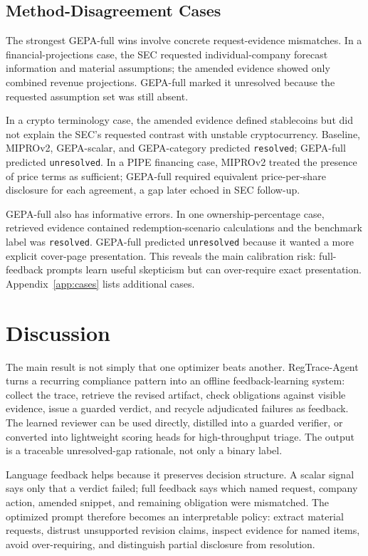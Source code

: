 \documentclass[11pt]{article}
\newcommand{\framework}{RegTrace-Agent}
\begin{document}
\subsection{Method-Disagreement Cases}

The strongest GEPA-full wins involve concrete request-evidence mismatches. In a financial-projections case, the SEC requested individual-company forecast information and material assumptions; the amended evidence showed only combined revenue projections. GEPA-full marked it unresolved because the requested assumption set was still absent.

In a crypto terminology case, the amended evidence defined stablecoins but did not explain the SEC's requested contrast with unstable cryptocurrency. Baseline, MIPROv2, GEPA-scalar, and GEPA-category predicted \texttt{resolved}; GEPA-full predicted \texttt{unresolved}. In a PIPE financing case, MIPROv2 treated the presence of price terms as sufficient; GEPA-full required equivalent price-per-share disclosure for each agreement, a gap later echoed in SEC follow-up.

GEPA-full also has informative errors. In one ownership-percentage case, retrieved evidence contained redemption-scenario calculations and the benchmark label was \texttt{resolved}. GEPA-full predicted \texttt{unresolved} because it wanted a more explicit cover-page presentation. This reveals the main calibration risk: full-feedback prompts learn useful skepticism but can over-require exact presentation. Appendix~\ref{app:cases} lists additional cases.

\section{Discussion}

The main result is not simply that one optimizer beats another. \framework{} turns a recurring compliance pattern into an offline feedback-learning system: collect the trace, retrieve the revised artifact, check obligations against visible evidence, issue a guarded verdict, and recycle adjudicated failures as feedback. The learned reviewer can be used directly, distilled into a guarded verifier, or converted into lightweight scoring heads for high-throughput triage. The output is a traceable unresolved-gap rationale, not only a binary label.

Language feedback helps because it preserves decision structure. A scalar signal says only that a verdict failed; full feedback says which named request, company action, amended snippet, and remaining obligation were mismatched. The optimized prompt therefore becomes an interpretable policy: extract material requests, distrust unsupported revision claims, inspect evidence for named items, avoid over-requiring, and distinguish partial disclosure from resolution.
\end{document}
